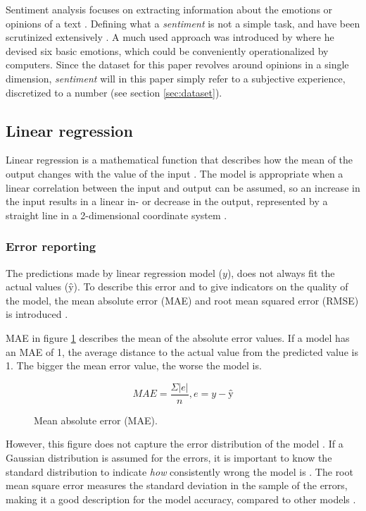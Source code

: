 \documentclass[a4paper]{article}
\begin{document}
Sentiment analysis focuses on extracting information about the emotions or
opinions of a text \citep{PangLee2008}.
Defining what a \textit{sentiment} is not a simple task, and have been
scrutinized extensively \citep{Jurafsky2000, PangLee2008}.
A much used approach was introduced by \cite{Ekman92} where he devised six
basic emotions, which could be conveniently operationalized by computers.
Since the dataset for this paper revolves around opinions in a single dimension,
\textit{sentiment} will in this paper simply refer to a subjective experience,
discretized to a number (see section \ref{sec:dataset}).

\subsection{Linear regression}
Linear regression is a mathematical function that describes how the mean of the
output changes with the value of the input \citep{Agresti2008}. The model is
appropriate when a linear correlation between the input and output can be
assumed, so an increase in the input results in a linear in- or decrease in
the output, represented by a straight line in a 2-dimensional coordinate system
\citep{Agresti2008}.

\subsubsection{Error reporting}
The predictions made by linear regression model ($y$), does not always fit
the actual values ($ŷ$). To describe this error and to give indicators on the
quality of the model, the mean absolute error (MAE) and root mean squared
error (RMSE) is introduced \citep{Agresti2008, Chai2014}.

MAE in figure \ref{fig:mae} describes the mean of the absolute error values.
If a model has an MAE of 1, the average distance to the actual value from the
predicted value is 1. The bigger the mean error value, the worse the model is.

\begin{figure}
\[MAE = \frac{\Sigma |e|}{n}, e = y - ŷ\]
\caption{Mean absolute error (MAE).}
\label{fig:mae}
\end{figure}

However, this figure does not capture the error distribution of the model
\citep{Chai2014}. If
a Gaussian distribution is assumed for the errors, it is important to know
the standard distribution to indicate \textit{how} consistently wrong the model
is \citep{Agresti2008}. The root mean square error measures the standard
deviation in the sample of the errors, making it a good description for the
model accuracy, compared to other models \citep{Agresti2008, Chai2014}.
\end{document}
